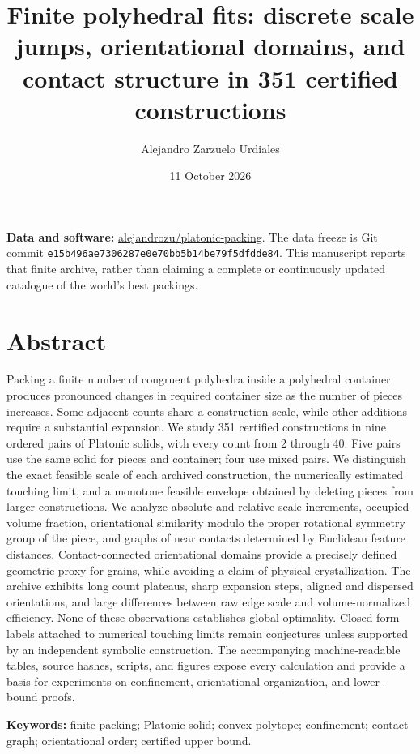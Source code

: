 \documentclass[11pt,a4paper]{article}
\title{Finite polyhedral fits: discrete scale jumps, orientational domains, and contact structure in 351 certified constructions}
\author{Alejandro Zarzuelo Urdiales}
\date{11 October 2026}
\begin{document}
\maketitle


\textbf{Data and software:} \href{https://github.com/alejandrozu/platonic-packing}{alejandrozu/platonic-packing}. The data freeze is Git commit \nolinkurl{e15b496ae7306287e0e70bb5b14be79f5dfdde84}. This manuscript reports that finite archive, rather than claiming a complete or continuously updated catalogue of the world's best packings.

\section*{Abstract}

Packing a finite number of congruent polyhedra inside a polyhedral container produces pronounced changes in required container size as the number of pieces increases. Some adjacent counts share a construction scale, while other additions require a substantial expansion. We study 351 certified constructions in nine ordered pairs of Platonic solids, with every count from 2 through 40. Five pairs use the same solid for pieces and container; four use mixed pairs. We distinguish the exact feasible scale of each archived construction, the numerically estimated touching limit, and a monotone feasible envelope obtained by deleting pieces from larger constructions. We analyze absolute and relative scale increments, occupied volume fraction, orientational similarity modulo the proper rotational symmetry group of the piece, and graphs of near contacts determined by Euclidean feature distances. Contact-connected orientational domains provide a precisely defined geometric proxy for grains, while avoiding a claim of physical crystallization. The archive exhibits long count plateaus, sharp expansion steps, aligned and dispersed orientations, and large differences between raw edge scale and volume-normalized efficiency. None of these observations establishes global optimality. Closed-form labels attached to numerical touching limits remain conjectures unless supported by an independent symbolic construction. The accompanying machine-readable tables, source hashes, scripts, and figures expose every calculation and provide a basis for experiments on confinement, orientational organization, and lower-bound proofs.

\textbf{Keywords:} finite packing; Platonic solid; convex polytope; confinement; contact graph; orientational order; certified upper bound.
\end{document}
